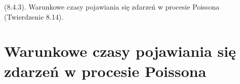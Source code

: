 {
\makeatletter
{}
\makeatother
\graphicspath{{../probabil}}

\begin{questiontext}
	(8.4.3). Warunkowe czasy pojawiania się zdarzeń w procesie Poissona (Twierdzenie 8.14).
\end{questiontext}

\section{Warunkowe czasy pojawiania się zdarzeń w procesie Poissona}

}